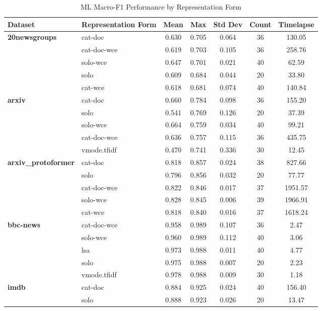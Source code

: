 \documentclass[final]{clv2025}
\begin{document}
\begin{table}[h!]
\centering
\scriptsize
\caption{ML Macro-F1 Performance by Representation Form}
\label{tab:macro_f1_repr_form}
\begin{tabular}{@{}p{2.2cm} p{2.6cm} c c c c c@{}}
\toprule
\textbf{Dataset} & \textbf{Representation Form} & \textbf{Mean} & \textbf{Max} & \textbf{Std Dev} & \textbf{Count} & \textbf{Timelapse} \\
\midrule
\textbf{20newsgroups} & cat-doc & 0.630 & 0.705 & 0.064 & 36 & 130.05 \\
 & cat-doc-wce & 0.619 & 0.703 & 0.105 & 36 & 258.76 \\
 & solo-wce & 0.647 & 0.701 & 0.021 & 40 & 62.59 \\
 & solo & 0.609 & 0.684 & 0.044 & 20 & 33.80 \\
 & cat-wce & 0.618 & 0.681 & 0.074 & 40 & 140.84 \\
\midrule
\textbf{arxiv} & cat-doc & 0.660 & 0.784 & 0.098 & 36 & 155.20 \\
 & solo & 0.541 & 0.769 & 0.126 & 20 & 37.39 \\
 & solo-wce & 0.664 & 0.759 & 0.034 & 40 & 99.21 \\
 & cat-doc-wce & 0.636 & 0.757 & 0.115 & 36 & 435.75 \\
 & vmode.tfidf & 0.470 & 0.741 & 0.336 & 30 & 12.45 \\
\midrule
\textbf{arxiv\_protoformer} & cat-doc & 0.818 & 0.857 & 0.024 & 38 & 827.66 \\
 & solo & 0.796 & 0.856 & 0.032 & 20 & 77.77 \\
 & cat-doc-wce & 0.822 & 0.846 & 0.017 & 37 & 1951.57 \\
 & solo-wce & 0.828 & 0.845 & 0.006 & 39 & 1966.91 \\
 & cat-wce & 0.818 & 0.840 & 0.016 & 37 & 1618.24 \\
\midrule
\textbf{bbc-news} & cat-doc-wce & 0.958 & 0.989 & 0.107 & 36 & 2.47 \\
 & solo-wce & 0.960 & 0.989 & 0.112 & 40 & 3.06 \\
 & lsa & 0.973 & 0.988 & 0.011 & 40 & 4.77 \\
 & solo & 0.975 & 0.988 & 0.007 & 20 & 2.23 \\
 & vmode.tfidf & 0.978 & 0.988 & 0.009 & 30 & 1.18 \\
\midrule
\textbf{imdb} & cat-doc & 0.884 & 0.925 & 0.024 & 40 & 156.40 \\
 & solo & 0.888 & 0.923 & 0.026 & 20 & 13.47 \\

\end{tabular}
\end{table}
\end{document}
